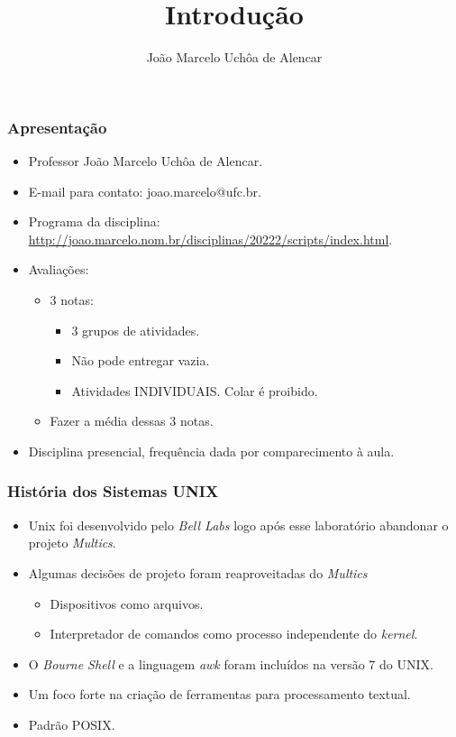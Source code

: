 \documentclass{beamer}
\title{Introdução}
\author[João Marcelo Uchôa de Alencar]{João Marcelo Uchôa de Alencar}
\institute{Universidade Federal do Ceará - Quixadá}
\begin{document}
   \begin{frame}
      \titlepage
   \end{frame}


\begin{frame}
   \frametitle{Apresentação}
   \begin{itemize}
      \item Professor João Marcelo Uchôa de Alencar.
      \item E-mail para contato: joao.marcelo@ufc.br.
      \item Programa da disciplina: \url{http://joao.marcelo.nom.br/disciplinas/20222/scripts/index.html}.
      \item Avaliações:
      \begin{itemize}
         \item 3 notas: 
	      \begin{itemize}
            \item 3 grupos de atividades.
            \item Não pode entregar vazia.
            \item Atividades INDIVIDUAIS. Colar é proibido. 
         \end{itemize}
	      \item Fazer a média dessas 3 notas. 
      \end{itemize}
      \item Disciplina presencial, frequência dada por comparecimento à aula. 
   \end{itemize}
\end{frame}


\begin{frame}
   \frametitle{História dos Sistemas UNIX}
   \begin{itemize}
      \item Unix foi desenvolvido pelo \textit{Bell Labs} logo após esse laboratório abandonar o projeto \textit{Multics}.
      \item Algumas decisões de projeto foram reaproveitadas do \textit{Multics}
      \begin{itemize}
         \item Dispositivos como arquivos.
	 \item Interpretador de comandos como processo independente do \textit{kernel}.
      \end{itemize}
      \item O \textit{Bourne Shell} e a linguagem \textit{awk} foram incluídos na versão 7 do UNIX.
      \item Um foco forte na criação de ferramentas para processamento textual.
      \item Padrão POSIX.
   \end{itemize}
\end{frame}
\end{document}

